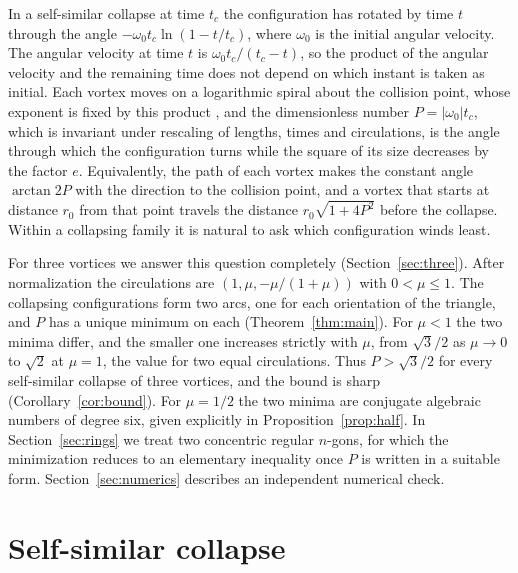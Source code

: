 \documentclass[11pt]{article}
\theoremstyle{definition}
\begin{document}
In a self-similar collapse at time $t_c$ the configuration has rotated by time $t$ through the angle $-\omega_0 t_c \ln(1 - t/t_c)$, where $\omega_0$ is the initial angular velocity. The angular velocity at time $t$ is $\omega_0 t_c/(t_c - t)$, so the product of the angular velocity and the remaining time does not depend on which instant is taken as initial. Each vortex moves on a logarithmic spiral about the collision point, whose exponent is fixed by this product \cite[Eq.~(29)]{aref2010}, and the dimensionless number $P = |\omega_0| t_c$, which is invariant under rescaling of lengths, times and circulations, is the angle through which the configuration turns while the square of its size decreases by the factor $e$. Equivalently, the path of each vortex makes the constant angle $\arctan 2P$ with the direction to the collision point, and a vortex that starts at distance $r_0$ from that point travels the distance $r_0 \sqrt{1 + 4P^2}$ before the collapse. Within a collapsing family it is natural to ask which configuration winds least.

For three vortices we answer this question completely (Section~\ref{sec:three}). After normalization the circulations are $(1, \mu, -\mu/(1 + \mu))$ with $0 < \mu \le 1$. The collapsing configurations form two arcs, one for each orientation of the triangle, and $P$ has a unique minimum on each (Theorem~\ref{thm:main}). For $\mu < 1$ the two minima differ, and the smaller one increases strictly with $\mu$, from $\sqrt{3}/2$ as $\mu \to 0$ to $\sqrt{2}$ at $\mu = 1$, the value for two equal circulations. Thus $P > \sqrt{3}/2$ for every self-similar collapse of three vortices, and the bound is sharp (Corollary~\ref{cor:bound}). For $\mu = 1/2$ the two minima are conjugate algebraic numbers of degree six, given explicitly in Proposition~\ref{prop:half}. In Section~\ref{sec:rings} we treat two concentric regular $n$-gons, for which the minimization reduces to an elementary inequality once $P$ is written in a suitable form. Section~\ref{sec:numerics} describes an independent numerical check.

\section{Self-similar collapse}
\end{document}
